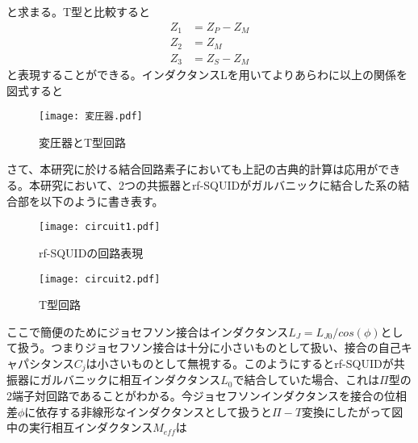 と求まる。T型と比較すると
\begin{eqnarray}
    Z_1 &= Z_P-Z_M\\
    Z_2 &= Z_M\\
    Z_3 &= Z_S-Z_M
\end{eqnarray}
と表現することができる。インダクタンスLを用いてよりあらわに以上の関係を図式すると
\begin{figure}[H]
    \centering
    \texttt{[image: 変圧器.pdf]}
    \caption{変圧器とT型回路}
\end{figure}
さて、本研究に於ける結合回路素子においても上記の古典的計算は応用ができる\cite*{Tian_2008}。本研究において、2つの共振器とrf-SQUIDがガルバニックに結合した系の結合部を以下のように書き表す。
\begin{figure}[H]
    \begin{minipage}[t]{0.5\columnwidth}
        \centering
        \texttt{[image: circuit1.pdf]}
        \caption{rf-SQUIDの回路表現}
    \end{minipage}%
    \begin{minipage}[t]{0.5\columnwidth}
        \centering
        \texttt{[image: circuit2.pdf]}
        \caption{T型回路}
    \end{minipage}
\end{figure}
ここで簡便のためにジョセフソン接合はインダクタンス$L_J = L_{J0}/cos(\phi)$として扱う。つまりジョセフソン接合は十分に小さいものとして扱い、接合の自己キャパシタンス$C_j$は小さいものとして無視する。このようにするとrf-SQUIDが共振器にガルバニックに相互インダクタンス$L_0$で結合していた場合、これは$\Pi$型の2端子対回路であることがわかる。今ジョセフソンインダクタンスを接合の位相差$\phi$に依存する非線形なインダクタンスとして扱うと$\Pi-T$変換にしたがって図中の実行相互インダクタンス$M_{eff}$は

